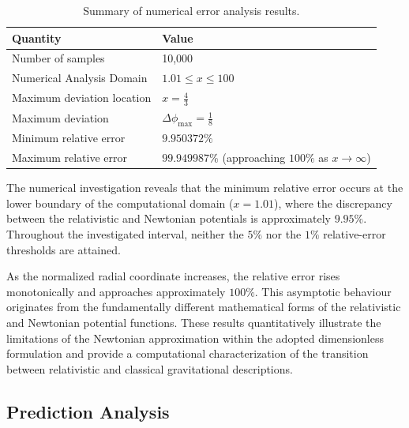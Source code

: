 \documentclass[
]{article}
\begin{document}
\begin{table}[H]
\centering
\caption{Summary of numerical error analysis results.}
\label{tab:error_summary}

\renewcommand{\arraystretch}{1.45}

\begin{tabular}{@{} l p{7cm} @{}}
\toprule
\textbf{Quantity} & \textbf{Value} \\
\midrule

Number of samples &
10,000 \\[2pt]

Numerical Analysis Domain &
$1.01 \leq x \leq 100$ \\[2pt]

Maximum deviation location &
$x=\frac{4}{3}$ \\[2pt]

Maximum deviation &
$\Delta\phi_{\max}=\frac{1}{8}$ \\[2pt]

Minimum relative error &
$9.950372\%$ \\[2pt]

Maximum relative error &
$99.949987\%$ (approaching $100\%$ as $x\rightarrow\infty$) \\

\bottomrule
\end{tabular}

\end{table}

The numerical investigation reveals that the minimum relative error occurs at the lower boundary of the computational domain ($x=1.01$), where the discrepancy between the relativistic and Newtonian potentials is approximately $9.95\%$. Throughout the investigated interval, neither the $5\%$ nor the $1\%$ relative-error thresholds are attained.

As the normalized radial coordinate increases, the relative error rises monotonically and approaches approximately $100\%$. This asymptotic behaviour originates from the fundamentally different mathematical forms of the relativistic and Newtonian potential functions. These results quantitatively illustrate the limitations of the Newtonian approximation within the adopted dimensionless formulation and provide a computational characterization of the transition between relativistic and classical gravitational descriptions.

\subsection{Prediction Analysis}\label{prediction-analysis}
\end{document}
